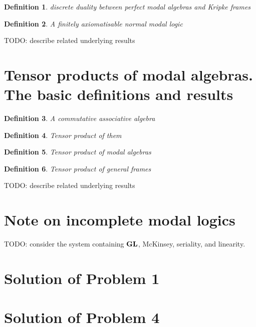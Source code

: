 \documentclass[a4paper]{article}
\theoremstyle{defin}
\newtheorem{defin}{Definition}
\theoremstyle{theorem}
\theoremstyle{prop}
\theoremstyle{lemma}
\theoremstyle{ex}
\theoremstyle{col}
\begin{document}
\begin{defin} discrete duality between perfect modal algebras and Kripke frames
\end{defin}

\begin{defin} A finitely axiomatisable normal modal logic
\end{defin}

TODO: describe related underlying results

\section{Tensor products of modal algebras. The basic definitions and results}

\begin{defin} A commutative associative algebra
\end{defin}

\begin{defin} Tensor product of them
\end{defin}

\begin{defin} Tensor product of modal algebras
\end{defin}

\begin{defin} Tensor product of general frames
\end{defin}

TODO: describe related underlying results

\section{Note on incomplete modal logics}

TODO: consider the system containing ${\bf GL}$, McKinsey, seriality, and linearity.

\section{Solution of Problem 1}

\section{Solution of Problem 4}

\newpage



\end{document}

